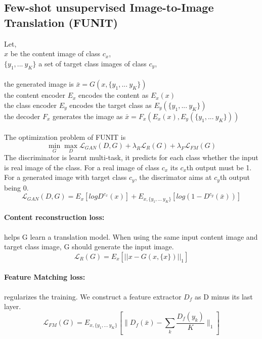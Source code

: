 \documentclass[../main.tex]{subfiles}
\begin{document}
\subsection{Few-shot unsupervised Image-to-Image Translation (FUNIT)}
Let, \\
$x$ be the content image of class $c_x$, \\
$\{y_1, ...\ y_K\}$ a set of target class images of class $c_y$, \\
\\
the generated image is $\bar{x} = G(x, \{y_1, ...\ y_K\})$ \\
the content encoder $E_x$ encodes the content as $E_x(x)$ \\
the class encoder $E_y$ encodes the target class as $E_y(\{y_1, ...\ y_K\})$ \\
the decoder $F_x$ generates the image as $\bar{x} = F_x(E_x(x), E_y(\{y_1, ...\ y_K\}))$ \\
\\
The optimization problem of FUNIT is
\begin{equation}
    \min_G\max_D \mathcal{L}_{GAN}(D, G) + \lambda_R\mathcal{L}_R(G) + \lambda_F\mathcal{L}_{FM}(G)
\end{equation}
The discriminator is learnt multi-task, it predicts for each class whether the input is real image of
the class. For a real image of class $c_x$ its $c_x$th output must
be 1. For a generated image with target class $c_y$, the discrimator aims at $c_y$th  output being
0. \\
\begin{equation}
    \mathcal{L}_{GAN}(D, G) = E_x[log D^{c_x}(x)] + E_{x, \{y_1, ...\ y_K\}}[log(1-D^{c_y}(\bar{x}))]
\end{equation}

\paragraph{Content reconstruction loss:} helps G learn a translation model. When using the same
input content image and target class image, G should generate the input image.
\begin{equation}
    \mathcal{L}_R(G) = E_x[||x - G(x, \{x\})||_1]
\end{equation}
\paragraph{Feature Matching loss:} regularizes the training. We construct a feature extractor $D_f$
as D minus its last layer.
\begin{equation}
    \mathcal{L}_{FM}(G) = E_{x, \{y_1, ...\ y_K\}}
        \left[ \big\| D_f(\bar{x}) - \sum_k{\frac{D_f(y_k)}{K}} \big\|_1 \right]
\end{equation}
\end{document}
